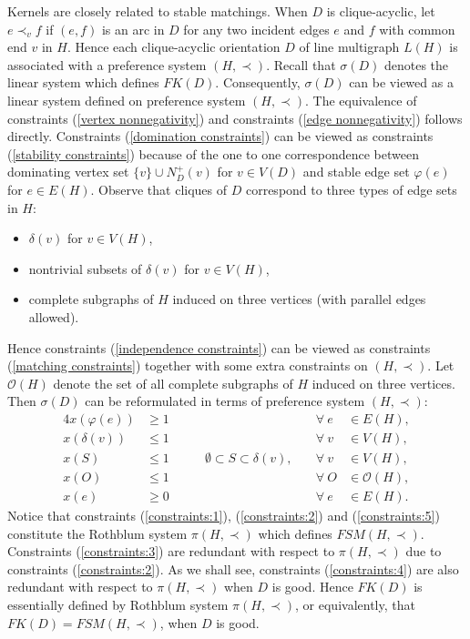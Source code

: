 \documentclass[11pt]{article}
\numberwithin{theorem}{section}
\begin{document}
Kernels are closely related to stable matchings.
When $D$ is clique-acyclic, let $e\prec_v f$ if $(e,f)$ is an arc in $D$ for any two incident edges $e$ and $f$ with common end $v$ in $H$.
Hence each clique-acyclic orientation $D$ of line multigraph $L(H)$ is associated with a preference system $(H,\prec)$.
Recall that $\sigma(D)$ denotes the linear system which defines $FK(D)$. 
Consequently, $\sigma(D)$ can be viewed as a linear system defined on preference system $(H,\prec)$. 
The equivalence of constraints (\ref{vertex nonnegativity}) and constraints (\ref{edge nonnegativity}) follows directly. Constraints (\ref{domination constraints}) can be viewed as constraints (\ref{stability constraints}) because of the one to one correspondence between dominating vertex set $\{v\}\cup N^+_D(v)$ for $v\in V(D)$ and stable edge set $\varphi(e)$ for $e\in E(H)$.
Observe that cliques of $D$ correspond to three types of edge sets in $H$:
\begin{itemize}
\item $\delta(v)$ for $v\in V(H)$,
\item nontrivial subsets of $\delta(v)$ for $v\in V(H)$,
\item complete subgraphs of $H$ induced on three vertices (with parallel edges allowed).
\end{itemize}
Hence constraints (\ref{independence constraints}) can be viewed as constraints (\ref{matching constraints}) together with some extra constraints on $(H,\prec)$. Let $\mathcal{O}(H)$ denote the set of all complete subgraphs of $H$ induced on three vertices. 
Then $\sigma(D)$ can be reformulated in terms of preference system $(H,\prec)$:
\begin{alignat}{4}
x(\varphi(e)) &\geq 1 &\qquad &\forall ~e &\in E(H),\label{constraints:1}\\
x(\delta(v)) &\leq 1 &\qquad &\forall ~v &\in V(H),\label{constraints:2}\\
x(S) &\leq 1 &\qquad \emptyset\subset S\subset \delta(v),\quad &\forall ~v&\in V(H),\label{constraints:3}\\
x(O) &\leq 1 &\qquad &\forall ~O&\in \mathcal{O}(H),\label{constraints:4}\\
x(e) &\geq 0 &\qquad &\forall ~e &\in E(H)\label{constraints:5}.
\end{alignat}
Notice that constraints (\ref{constraints:1}), (\ref{constraints:2}) and (\ref{constraints:5}) constitute the Rothblum system $\pi(H,\prec)$ which defines $FSM(H,\prec)$. Constraints (\ref{constraints:3}) are redundant with respect to $\pi(H,\prec)$ due to constraints (\ref{constraints:2}). As we shall see, constraints (\ref{constraints:4}) are also redundant with respect to $\pi(H,\prec)$ when $D$ is good. Hence $FK(D)$ is essentially defined by Rothblum system $\pi(H,\prec)$, or equivalently, that $FK(D)=FSM(H,\prec)$, when $D$ is good.
\end{document}
